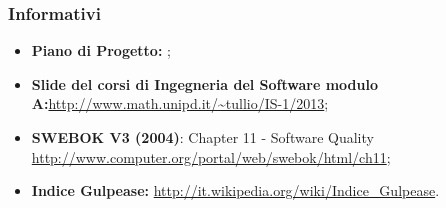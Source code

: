 \subsubsection{Informativi}
\begin{itemize}
	\item \textbf{Piano di Progetto:} \PdP;
	\item \textbf{Slide del corsi di Ingegneria del Software modulo A:}\url{http://www.math.unipd.it/~tullio/IS-1/2013};
	\item \textbf{SWEBOK V3 (2004)}: Chapter 11 - Software Quality \url{http://www.computer.org/portal/web/swebok/html/ch11};

	\item \textbf{Indice Gulpease:} 
		\url{http://it.wikipedia.org/wiki/Indice_Gulpease}.
\end{itemize}

\pagebreak